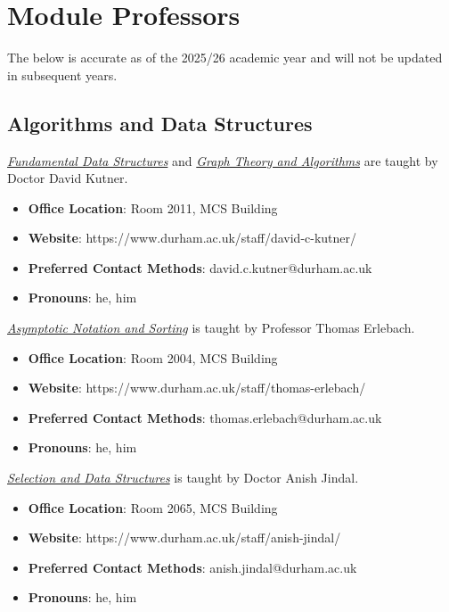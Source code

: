 \section{Module Professors}

The below is accurate as of the 2025/26 academic year and will not be updated in subsequent years.

\subsection{Algorithms and Data Structures}

\hyperref[ads:section:1.fds]{\textit{Fundamental Data Structures}} and \hyperref[ads:section:4.gta]{\textit{Graph Theory and Algorithms}} are taught by Doctor David Kutner.
\begin{itemize}
    \item \textbf{Office Location}: Room 2011, MCS Building
    \item \textbf{Website}: https://www.durham.ac.uk/staff/david-c-kutner/
    \item \textbf{Preferred Contact Methods}: david.c.kutner@durham.ac.uk
    \item \textbf{Pronouns}: he, him
\end{itemize}
    
\hyperref[ads:section:2.ans]{\textit{Asymptotic Notation and Sorting}} is taught by Professor Thomas Erlebach.
\begin{itemize}
    \item \textbf{Office Location}: Room 2004, MCS Building
    \item \textbf{Website}: https://www.durham.ac.uk/staff/thomas-erlebach/
    \item \textbf{Preferred Contact Methods}: thomas.erlebach@durham.ac.uk
    \item \textbf{Pronouns}: he, him
\end{itemize}
    
\hyperref[ads:section:3.sds]{\textit{Selection and Data Structures}} is taught by Doctor Anish Jindal.
\begin{itemize}
    \item \textbf{Office Location}: Room 2065, MCS Building
    \item \textbf{Website}: https://www.durham.ac.uk/staff/anish-jindal/
    \item \textbf{Preferred Contact Methods}: anish.jindal@durham.ac.uk
    \item \textbf{Pronouns}: he, him
\end{itemize}

